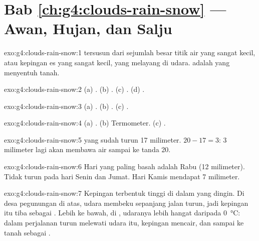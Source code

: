 \section*{Bab \ref{ch:g4:clouds-rain-snow} --- Awan, Hujan, dan Salju}

\begin{solution}{exo:g4:clouds-rain-snow:1}
 tersusun dari sejumlah besar titik air yang sangat kecil, atau
kepingan es yang sangat kecil, yang melayang di udara.  adalah 
yang menyentuh tanah.
\end{solution}

\begin{solution}{exo:g4:clouds-rain-snow:2}
(a) . (b) . (c) . (d) .
\end{solution}

\begin{solution}{exo:g4:clouds-rain-snow:3}
(a) . (b) . (c) .
\end{solution}

\begin{solution}{exo:g4:clouds-rain-snow:4}
(a) . (b) Termometer. (c) .
\end{solution}

\begin{solution}{exo:g4:clouds-rain-snow:5}
 yang sudah turun 17 milimeter. $20 - 17 = 3$: 3 milimeter lagi akan
membawa air sampai ke tanda 20.
\end{solution}

\begin{solution}{exo:g4:clouds-rain-snow:6}
Hari yang paling basah adalah Rabu (12 milimeter). Tidak turun  pada
hari Senin dan Jumat. Hari Kamis mendapat 7 milimeter.
\end{solution}

\begin{solution}{exo:g4:clouds-rain-snow:7}
Kepingan  terbentuk tinggi di dalam  yang dingin. Di desa
pegunungan di atas, udara membeku sepanjang jalan turun, jadi kepingan itu
tiba sebagai . Lebih ke bawah, di , udaranya lebih hangat
daripada \SI{0}{\celsius}: dalam perjalanan turun melewati udara itu,
kepingan  mencair, dan sampai ke tanah sebagai .
\end{solution}

